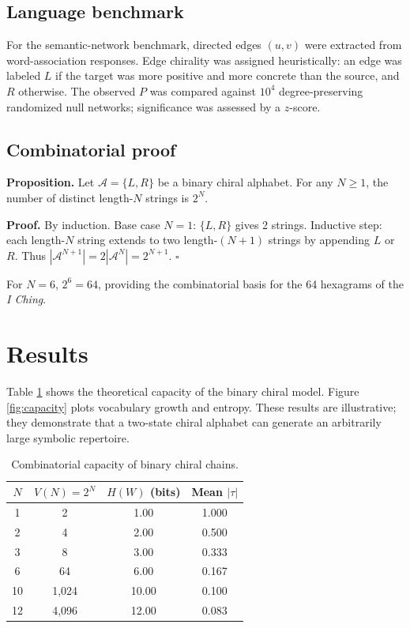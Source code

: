 \documentclass[11pt,a4paper]{article}
\begin{document}
\subsection{Language benchmark}

For the semantic-network benchmark, directed edges $(u,v)$ were extracted from word-association responses. Edge chirality was assigned heuristically: an edge was labeled $L$ if the target was more positive and more concrete than the source, and $R$ otherwise. The observed $P$ was compared against $10^4$ degree-preserving randomized null networks; significance was assessed by a $z$-score.

\subsection{Combinatorial proof}

\textbf{Proposition.} Let $\mathcal{A}=\{L,R\}$ be a binary chiral alphabet. For any $N\ge 1$, the number of distinct length-$N$ strings is $2^N$.

\textbf{Proof.} By induction. Base case $N=1$: $\{L,R\}$ gives 2 strings. Inductive step: each length-$N$ string extends to two length-$(N+1)$ strings by appending $L$ or $R$. Thus $|\mathcal{A}^{N+1}| = 2|\mathcal{A}^N| = 2^{N+1}$. $\square$

For $N=6$, $2^6=64$, providing the combinatorial basis for the 64 hexagrams of the \emph{I Ching}.

\section{Results}

Table \ref{tab:sim} shows the theoretical capacity of the binary chiral model. Figure \ref{fig:capacity} plots vocabulary growth and entropy. These results are illustrative; they demonstrate that a two-state chiral alphabet can generate an arbitrarily large symbolic repertoire.

\begin{table}[htbp]
\centering
\caption{Combinatorial capacity of binary chiral chains.}
\label{tab:sim}
\begin{tabular}{@{}cccc@{}}
\toprule
$N$ & $V(N)=2^N$ & $H(W)$ (bits) & Mean $|\tau|$ \\
\midrule
1 & 2 & 1.00 & 1.000 \\
2 & 4 & 2.00 & 0.500 \\
3 & 8 & 3.00 & 0.333 \\
6 & 64 & 6.00 & 0.167 \\
10 & 1,024 & 10.00 & 0.100 \\
12 & 4,096 & 12.00 & 0.083 \\
\bottomrule
\end{tabular}
\end{table}
\end{document}
